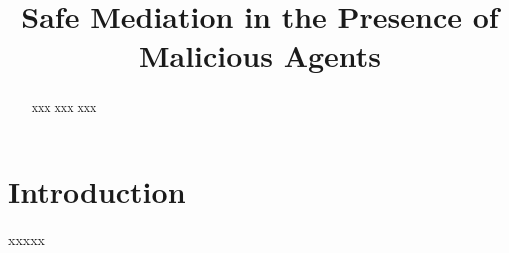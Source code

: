 \documentclass[acmsmall,review,anonymous,screen]{acmart}\settopmatter{printfolios=true,printacmref=false}
\begin{document}
 
\title{Safe Mediation in the Presence of Malicious Agents}
 



\begin{abstract}
xxx
xxx
xxx
\end{abstract}


\maketitle 




\section{Introduction}

xxxxx
\newcommand{\bM}{\texttt{bM}}
\newcommand{\bG}{\texttt{bG}}
\newcommand{\sM}{\texttt{sM}}
\newcommand{\sG}{\texttt{sG}}
\newcommand{\amt}{\texttt{amt}}
\newcommand{\prc}{\texttt{prc}}
\newcommand{\HonP}{\textcolor{teal}{{\mathcal H}{\textit{onPrs}}}}

\newcommand{\HonE}{\textcolor{teal}{{\mathcal H}{\textit{onEscr}}}}

\newcommand{\DisHonP}{\textcolor{red}{{\mathcal D}{\textit{isHonPrs}}}}
\newcommand{\BadP}{\textcolor{red}{{\neg}{\mathcal H}{\textit{onPrs}}}}

\newcommand{\CanTrade}{{{\mathcal C}{\textit{anTrade}}}}

\newcommand{\prs}{\ensuremath{\texttt{prs}}}

\end{document}
